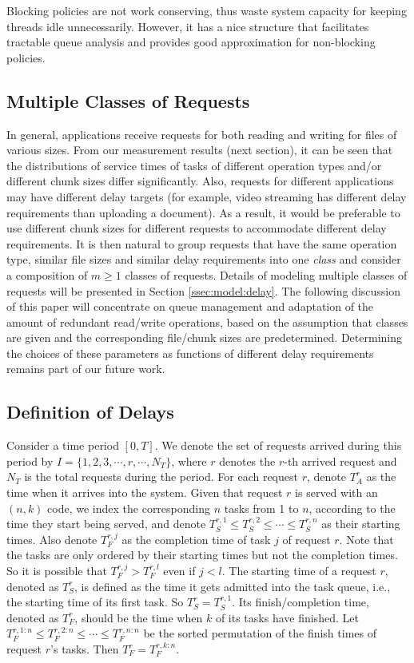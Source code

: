 \documentclass[journal]{IEEEtran}
\begin{document}
Blocking policies are not work conserving, thus waste system capacity for keeping  threads idle unnecessarily. However, it has a nice structure that facilitates tractable queue analysis and provides good approximation for non-blocking policies.



\subsection{Multiple Classes of Requests}

In general, applications receive requests for both reading and writing for files of various sizes. From our measurement results (next section), it can be seen  that the distributions of service times of tasks of different operation types and/or different chunk sizes differ significantly. Also, requests for different applications may have different delay targets (for example, video streaming has different delay requirements than uploading a document). As a result, it would be preferable to use different chunk sizes for different requests to accommodate different delay requirements. It is then natural to group requests that have the same operation type, similar file sizes and similar delay requirements into one {\em class} and consider a composition of $m\ge 1$ classes of requests. Details of modeling multiple classes of requests will be presented in Section \ref{ssec:model:delay}. The following discussion of this paper will concentrate on queue management and adaptation of the amount of redundant read/write operations, based on the assumption that classes are given and the corresponding file/chunk sizes are predetermined. Determining the choices of these parameters as functions of different delay requirements remains part of our future work. 


\subsection{Definition of Delays}
Consider a time period $[0,T]$. We denote the  set of requests arrived during this period by $I=\{1,2,3,\cdots,r,\cdots,N_T\}$, where  $r$ denotes the $r$-th arrived request and $N_T$ is the total requests during the period. For each request $r$, denote $T_A^r$ as the time when it arrives into the system. Given that request $r$ is served with an $(n,k)$ code, we index the corresponding $n$ tasks from 1 to $n$, according to the time they start being served, and denote $T_S^{r,1}\le T_S^{r,2}\le \cdots \le T_S^{r,n}$ as their starting times. Also denote $T_F^{r,j}$ as the completion time of task $j$ of request $r$. Note that the tasks are only ordered by their starting times but not the completion times. So it is possible that $T_F^{r,j} > T_F^{r,l}$ even if $j<l$. 
The starting time of a request $r$, denoted as $T_S^r$, is defined as the time it gets admitted into the task queue, i.e., the starting time of its first task. So $T_S^r = T_S^{r,1}$. Its finish/completion time, denoted as $T_F^r$, should be the time when $k$ of its tasks have finished. Let $T_F^{r,1:n}\le T_F^{r,2:n}\le \cdots\le T_F^{r,n:n}$ be the sorted permutation of the finish times of request $r$'s tasks. Then $T_F^r = T_F^{r,k:n}$.
\end{document}
